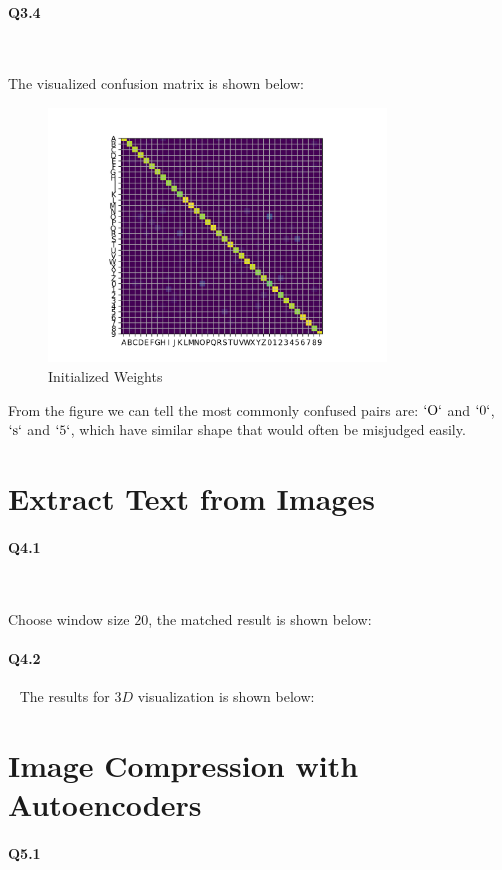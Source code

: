 \documentclass[11pt]{article} \usepackage{fullpage} \usepackage{graphicx} \usepackage{epstopdf} \usepackage{color} \usepackage{psfrag} \usepackage{pdfsync}\usepackage{indentfirst}\usepackage{subfigure}\usepackage{float}\usepackage[section]{placeins}
\begin{document}
\paragraph{Q3.4}~{}

The visualized confusion matrix is shown below:
\begin{figure}[H]
\centering
\includegraphics[width=0.8\textwidth]{results/q3_4.png}
\caption{Initialized Weights}
\end{figure}

From the figure we can tell the most commonly confused pairs are: $`\mathrm{O}`$ and $`0`$, $`\mathrm{s}`$ and $`5`$, which have similar shape that would often be misjudged easily.

\section{Extract Text from Images}

\paragraph{Q4.1}~{}

Choose window size $20$, the matched result is shown below:


\paragraph{Q4.2}~{}
The results for $3D$ visualization is shown below:


\section{Image Compression with Autoencoders}

\paragraph{Q5.1}~{}
\end{document}
